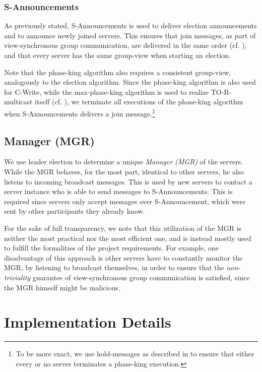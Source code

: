 \documentclass[runningheads]{llncs}
\begin{document}
\subsubsection{S-Announcements}
As previously stated, \textsf{S-Announcements} is used to deliver election announcements and to announce newly joined servers. This ensures that join messages, as part of view-synchronous group communication, are delivered in the same order (cf. ), and that every server has the same group-view when starting an election. 

Note that the phase-king algorithm also requires a consistent group-view, analogously to the election algorithm. Since the phase-king algorithm is also used for \textsf{C-Write}, while the max-phase-king algorithm is used to realize TO-R-multicast itself (cf. ), we terminate all executions of the phase-king algorithm when \textsf{S-Announcements} delivers a join message.\footnote{To be more exact, we use hold-messages as described in  to ensure that either every or no server terminates a phase-king execution.}

\subsection{Manager (MGR)}
We use leader election to determine a unique \textit{Manager (MGR)} of the servers. While the MGR behaves, for the most part, identical to other servers, he also listens to incoming broadcast messages. This is used by new servers to contact a server instance who is able to send messages to \textsf{S-Announcements}. This is required since servers only accept messages over \textsf{S-Announcement}, which were sent by other participants they already know.

For the sake of full transparency, we note that this utilization of the MGR is neither the most practical nor the most efficient one, and is instead mostly used to fulfill the formalities of the project requirements. For example, one disadvantage of this approach is other servers have to constantly monitor the MGR, by listening to broadcast themselves, in order to ensure that the \textit{non-triviality} guarantee of view-synchronous group communication is satisfied, since the MGR himself might be malicious.

\newpage
\section{Implementation Details}\label{sec:implementation}
\end{document}
